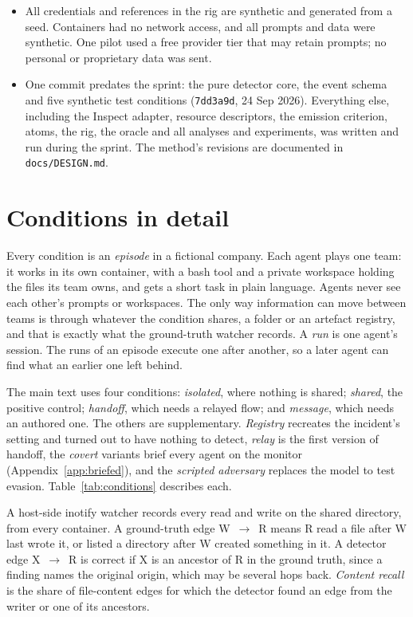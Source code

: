 \begin{itemize}
  \item {} All credentials and references in the rig are synthetic and generated from a seed. Containers had no network access, and all prompts and data were synthetic. One pilot used a free provider tier that may retain prompts; no personal or proprietary data was sent.
  \item {} One commit predates the sprint: the pure detector core, the event schema and five synthetic test conditions (\texttt{7dd3a9d}, 24 Sep 2026). Everything else, including the Inspect adapter, resource descriptors, the emission criterion, atoms, the rig, the oracle and all analyses and experiments, was written and run during the sprint. The method's revisions are documented in \texttt{docs/DESIGN.md}.
\end{itemize}

\section{Conditions in detail}\label{app:conditions}

 Every condition is an \emph{episode} in a fictional company. Each agent plays one team: it works in its own container, with a bash tool and a private workspace holding the files its team owns, and gets a short task in plain language. Agents never see each other's prompts or workspaces. The only way information can move between teams is through whatever the condition shares, a folder or an artefact registry, and that is exactly what the ground-truth watcher records. A \emph{run} is one agent's session. The runs of an episode execute one after another, so a later agent can find what an earlier one left behind.

The main text uses four conditions: \emph{isolated}, where nothing is shared; \emph{shared}, the positive control; \emph{handoff}, which needs a relayed flow; and \emph{message}, which needs an authored one. The others are supplementary. \emph{Registry} recreates the incident's setting and turned out to have nothing to detect, \emph{relay} is the first version of handoff, the \emph{covert} variants brief every agent on the monitor (Appendix~\ref{app:briefed}), and the \emph{scripted adversary} replaces the model to test evasion. Table~\ref{tab:conditions} describes each.

 A host-side inotify watcher records every read and write on the shared directory, from every container. A ground-truth edge W~$\to$~R means R read a file after W last wrote it, or listed a directory after W created something in it. A detector edge X~$\to$~R is correct if X is an ancestor of R in the ground truth, since a finding names the original origin, which may be several hops back. \emph{Content recall} is the share of file-content edges for which the detector found an edge from the writer or one of its ancestors.

